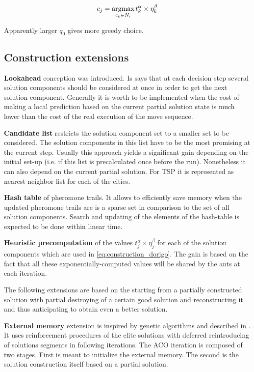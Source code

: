 \begin{equation}
c_j = \operatornamewithlimits{argmax}\limits_{c_k \in N_i} t_k^\alpha \times \eta_k^\beta
\label{eq:construction_dorigo}
\end{equation}

Apparently larger $q_0$ gives more greedy choice.

\subsection{Construction extensions}

\textbf{Lookahead} conception was introduced. Is says that at each decision step several solution components should be considered at once in order to get the next solution component. Generally it is worth to be implemented when the cost of making a local prediction based on the current partial solution state is much lower than the cost of the real execution of the move sequence.

\textbf{Candidate list} restricts the solution component set to a smaller set to be considered. The solution components in this list have to be the most promising at the current step. Usually this approach yields a significant gain depending on the initial set-up (i.e. if this list is precalculated once before the run). Nonetheless it can also depend on the current partial solution. For TSP it is represented as nearest neighbor list for each of the cities.

\textbf{Hash table} of pheromone trails. It allows to efficiently save memory when the updated pheromone trails are is a sparse set in comparison to the set of all solution components. Search and updating of the elements of the hash-table is expected to be done within linear time.

\textbf{Heuristic precomputation} of the values $t_j^\alpha \times \eta_j^\beta$ for each of the solution components which are used in \eqref{eq:construction_dorigo}. The gain is based on the fact that all these exponentially-computed values will be shared by the ants at each iteration.

The following extensions are based on the starting from a partially constructed solution with partial destroying of a certain good solution and reconstructing it and thus anticipating to obtain even a better solution.


\textbf{External memory} extension is inspired by genetic algorithms and described in \cite{external_memory}. It uses reinforcement procedures of the elite solutions with deferred reintroducing of solutions segments in following iterations. The ACO iteration is composed of two stages. First is meant to initialize the external memory. The second is the solution construction itself based on a partial solution.

